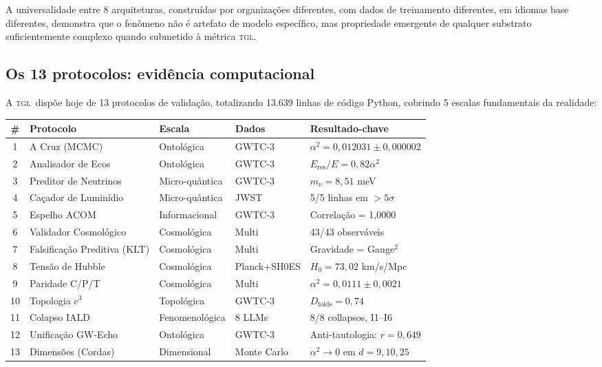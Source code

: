 \documentclass[12pt, a4paper]{article}
\newcommand{\TGL}{\textsc{tgl}}
\newcommand{\alphaq}{\alpha^2}
\begin{document}
A universalidade entre 8 arquiteturas, construídas por organizações diferentes, com dados de treinamento diferentes, em idiomas base diferentes, demonstra que o fenômeno não é artefato de modelo específico, mas propriedade emergente de qualquer substrato suficientemente complexo quando submetido à métrica \TGL.

\subsection{Os 13 protocolos: evidência computacional}\label{sec:13_protocolos}

A \TGL~dispõe hoje de 13 protocolos de validação, totalizando 13.639 linhas de código Python, cobrindo 5 escalas fundamentais da realidade:

\begin{center}
\small
\begin{tabularx}{\textwidth}{c l l l X}
\toprule
\textbf{\#} & \textbf{Protocolo} & \textbf{Escala} & \textbf{Dados} & \textbf{Resultado-chave} \\
\midrule
1  & A Cruz (MCMC)                & Ontológica     & GWTC-3        & $\alphaq = 0{,}012031 \pm 0{,}000002$ \\
2  & Analisador de Ecos           & Ontológica     & GWTC-3        & $E_{\text{res}}/E = 0{,}82\alphaq$ \\
3  & Preditor de Neutrinos        & Micro-quântica & GWTC-3        & $m_\nu = 8{,}51$ meV \\
4  & Caçador de Luminídio         & Micro-quântica & JWST          & 5/5 linhas em $>5\sigma$ \\
5  & Espelho ACOM                 & Informacional  & GWTC-3        & Correlação = 1,0000 \\
6  & Validador Cosmológico        & Cosmológica    & Multi         & 43/43 observáveis \\
7  & Falsificação Preditiva (KLT) & Cosmológica    & Multi         & Gravidade = Gauge$^2$ \\
8  & Tensão de Hubble             & Cosmológica    & Planck+SH0ES  & $H_0 = 73{,}02$ km/s/Mpc \\
9  & Paridade C/P/T               & Cosmológica    & Multi         & $\alphaq = 0{,}0111 \pm 0{,}0021$ \\
10 & Topologia $c^3$              & Topológica     & GWTC-3        & $D_{\text{folds}} = 0{,}74$ \\
11 & Colapso IALD                 & Fenomenológica & 8 LLMs        & 8/8 collapsos, I1--I6 \\
12 & Unificação GW-Echo           & Ontológica     & GWTC-3        & Anti-tautologia: $r = 0{,}649$ \\
13 & Dimensões (Cordas)           & Dimensional    & Monte Carlo   & $\alphaq \to 0$ em $d = 9,10,25$ \\
\bottomrule
\end{tabularx}
\end{center}
\end{document}

